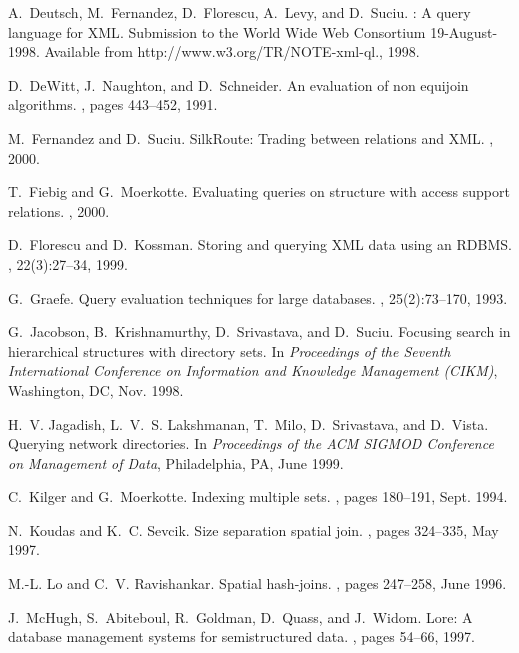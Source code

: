 \documentclass[fleqn,11pt]{article}
\begin{document}
\begin{small}
{
A.~Deutsch, M.~Fernandez, D.~Florescu, A.~Levy, and D.~Suciu.
: A query language for {XML}.
\newblock Submission to the World Wide Web Consortium 19-August-1998. Available
  from http://www.w3.org/TR/NOTE-xml-ql., 1998.

D.~DeWitt, J.~Naughton, and D.~Schneider.
\newblock An evaluation of non equijoin algorithms.
, pages 443--452, 1991.

M.~Fernandez and D.~Suciu.
\newblock SilkRoute: Trading between relations and XML.
, 2000.

T.~Fiebig and G.~Moerkotte.
\newblock Evaluating queries on structure with access support relations.
, 2000.

D.~Florescu and D.~Kossman.
\newblock Storing and querying {XML} data using an {RDBMS}.
, 22(3):27--34, 1999.

G.~Graefe.
\newblock Query evaluation techniques for large databases.
, 25(2):73--170, 1993.

G.~Jacobson, B.~Krishnamurthy, D.~Srivastava, and D.~Suciu.
\newblock Focusing search in hierarchical structures with directory sets.
\newblock In {\em Proceedings of the Seventh International Conference on
  Information and Knowledge Management (CIKM)}, Washington, DC, Nov. 1998.

H.~V. Jagadish, L.~V.~S. Lakshmanan, T.~Milo, D.~Srivastava, and D.~Vista.
\newblock Querying network directories.
\newblock In {\em Proceedings of the ACM SIGMOD Conference on Management of
  Data}, Philadelphia, PA, June 1999.

C.~Kilger and G.~Moerkotte.
\newblock Indexing multiple sets.
, pages 180--191, Sept. 1994.

N.~Koudas and K.~C. Sevcik.
\newblock Size separation spatial join.
, pages 324--335, May 1997.

M.-L. Lo and C.~V. Ravishankar.
\newblock Spatial hash-joins.
, pages 247--258, June 1996.

J.~McHugh, S.~Abiteboul, R.~Goldman, D.~Quass, and J.~Widom.
\newblock Lore: A database management systems for semistructured data.
, pages 54--66, 1997.


}
\end{small}
\end{document}
